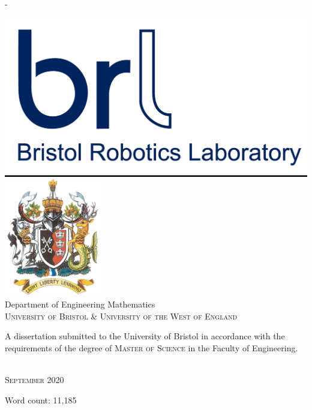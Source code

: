 \begin{titlingpage}
\begin{SingleSpace}
\begin{adjustwidth*}{\unitlength}{-\unitlength}
\begin{center}
\hspace{20mm}
\includegraphics[scale=0.1]{logos/BRL-SNI.png}
\hspace{20mm}
\includegraphics[scale=0.5]{logos/uweCrest.png}\\
\vspace{6mm}
{\large Department of Engineering Mathematics\\
\textsc{University of Bristol \& University of the West of England}}\\
\vspace{11mm}
\begin{minipage}{10cm}
A dissertation submitted to the University of Bristol in accordance with the requirements of the degree of \textsc{Master of Science} in the Faculty of Engineering.
\end{minipage}\\
\vspace{9mm}
{\large\textsc{September 2020}}
\vspace{12mm}
\end{center}
\begin{flushright}
{\small Word count: 11,185}
\end{flushright}
\end{adjustwidth*}
\end{SingleSpace}
\end{titlingpage}